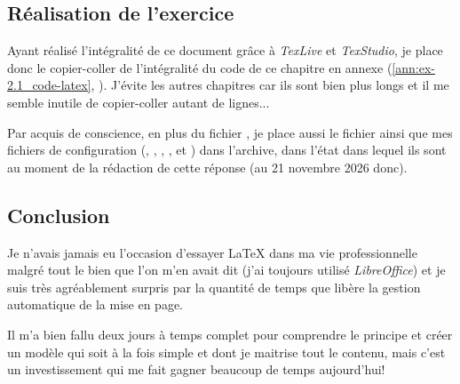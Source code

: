 \subsection{Réalisation de l'exercice}
Ayant réalisé l'intégralité de ce document grâce à \textit{TexLive} et \textit{TexStudio}, je place donc le copier-coller de l'intégralité du code de ce chapitre en annexe (\autoref{ann:ex-2.1_code-latex}, ). J'évite les autres chapitres car ils sont bien plus longs et il me semble inutile de copier-coller autant de lignes...

Par acquis de conscience, en plus du fichier , je place aussi le fichier  ainsi que mes fichiers de configuration (, , , ,  et ) dans l'archive, dans l'état dans lequel ils sont au moment de la rédaction de cette réponse (au 21 novembre 2026 donc).

\subsection{Conclusion}
Je n'avais jamais eu l'occasion d'essayer \LaTeX{ }dans ma vie professionnelle malgré tout le bien que l'on m'en avait dit (j'ai toujours utilisé \textit{LibreOffice}) et je suis très agréablement surpris par la quantité de temps que libère la gestion automatique de la mise en page.

Il m'a bien fallu deux jours à temps complet pour comprendre le principe et créer un modèle qui soit à la fois simple et dont je maitrise tout le contenu, mais c'est un investissement qui me fait gagner beaucoup de temps aujourd'hui!